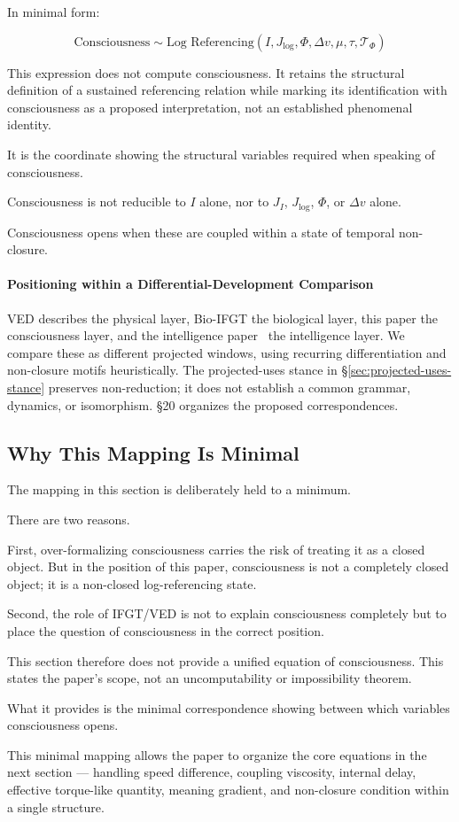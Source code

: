 In minimal form:

\begin{equation}
\text{Consciousness} \sim \text{Log Referencing}\!\left(I, J_{\log}, \Phi, \Delta v, \mu, \tau, \mathcal{T}_{\Phi}\right)
\end{equation}

This expression does not compute consciousness. It retains the structural definition of a sustained referencing relation while marking its identification with consciousness as a proposed interpretation, not an established phenomenal identity.

It is the coordinate showing the structural variables required when speaking of consciousness.

Consciousness is not reducible to $I$ alone, nor to $J_I$, $J_{\log}$, $\Phi$, or $\Delta v$ alone.

Consciousness opens when these are coupled within a state of temporal non-closure.

\paragraph{Positioning within a Differential-Development Comparison}
VED describes the physical layer, Bio-IFGT the biological layer, this paper
the consciousness layer, and the intelligence paper~\cite{Intelligence}
the intelligence layer. We compare these as different projected windows,
using recurring differentiation and non-closure motifs heuristically.
The projected-uses stance in §\ref{sec:projected-uses-stance} preserves
non-reduction; it does not establish a common grammar, dynamics, or
isomorphism. §20 organizes the proposed correspondences.

\subsection{Why This Mapping Is Minimal}


The mapping in this section is deliberately held to a minimum.

There are two reasons.

First, over-formalizing consciousness carries the risk of treating it as a closed object. But in the position of this paper, consciousness is not a completely closed object; it is a non-closed log-referencing state.

Second, the role of IFGT/VED is not to explain consciousness completely but to place the question of consciousness in the correct position.

This section therefore does not provide a unified equation of consciousness. This states the paper's scope, not an uncomputability or impossibility theorem.

What it provides is the minimal correspondence showing between which variables consciousness opens.

This minimal mapping allows the paper to organize the core equations in the next section — handling speed difference, coupling viscosity, internal delay, effective torque-like quantity, meaning gradient, and non-closure condition within a single structure.
